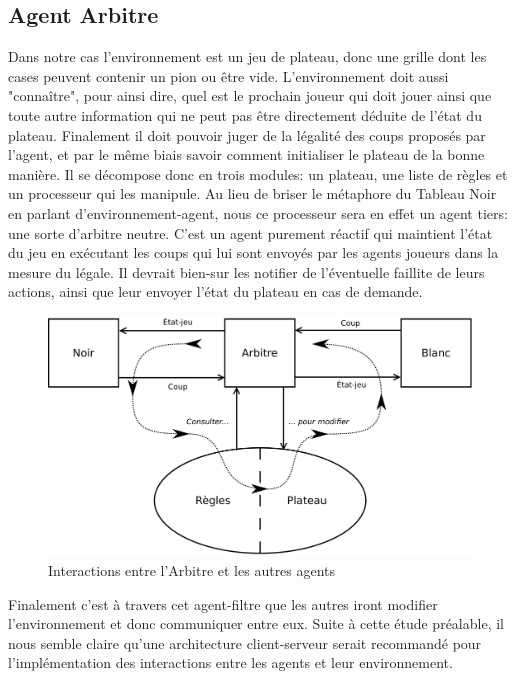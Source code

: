 \subsection{ Agent \og Arbitre \fg{} }

Dans notre cas l'environnement est un jeu de plateau, donc une grille dont les cases peuvent contenir un pion ou être vide. L'environnement doit aussi "connaître", pour ainsi dire, quel est le prochain joueur qui doit jouer ainsi que toute autre information qui ne peut pas être directement déduite de l'état du plateau. Finalement il doit pouvoir juger de la légalité des coups proposés par l'agent, et par le même biais savoir comment initialiser le plateau de la bonne manière.
Il se décompose donc en trois modules: un plateau, une liste de règles et un processeur qui les manipule. Au lieu de briser le métaphore du \og Tableau Noir \fg{} en parlant d'environnement-agent, nous ce processeur sera en effet un agent tiers: une sorte d'arbitre neutre. C'est un agent purement réactif qui maintient l'état du jeu en exécutant les coups qui lui sont envoyés par les agents joueurs dans la mesure du légale. Il devrait bien-sur les notifier de l'éventuelle faillite de leurs actions, ainsi que leur envoyer l'état du plateau en cas de demande. 

\begin{figure}[H] 
\centering
\includegraphics[width=\textwidth]{files/env/arbitre} 
\caption{Interactions entre l'Arbitre et les autres agents} 
\label{arbitre}
\end{figure}

Finalement c'est à travers cet agent-filtre que les autres iront modifier l'environnement et donc communiquer entre eux. Suite à cette étude préalable, il nous semble claire qu'une architecture client-serveur serait recommandé pour l'implémentation des interactions entre les agents et leur environnement.